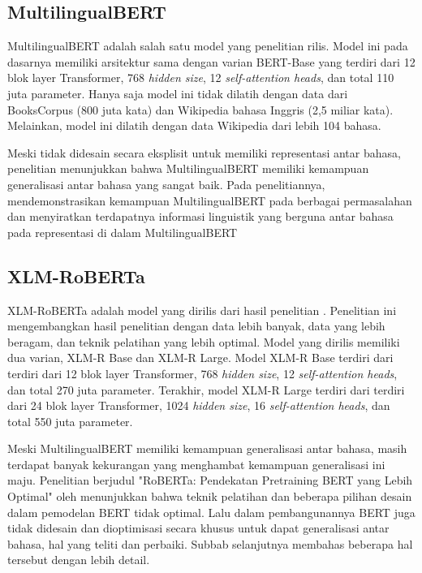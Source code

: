     \subsection{MultilingualBERT}
        MultilingualBERT adalah salah satu model yang penelitian \parencite{Devlin_Chang_Lee_Toutanova_2019} rilis. Model ini pada dasarnya memiliki arsitektur sama dengan varian BERT-Base yang terdiri dari 12 blok layer Transformer, 768 \textit{hidden size}, 12 \textit{self-attention heads}, dan total 110 juta parameter. Hanya saja model ini tidak dilatih dengan data dari BooksCorpus (800 juta kata) dan Wikipedia bahasa Inggris (2,5 miliar kata). Melainkan, model ini dilatih dengan data Wikipedia dari lebih 104 bahasa.
        
        Meski tidak didesain secara eksplisit untuk memiliki representasi antar bahasa, penelitian \parencite{Pires_Schlinger_Garrette_2019} menunjukkan bahwa MultilingualBERT memiliki kemampuan generalisasi antar bahasa yang sangat baik. Pada penelitiannya, \parencite{Pires_Schlinger_Garrette_2019} mendemonstrasikan kemampuan MultilingualBERT pada berbagai permasalahan dan menyiratkan terdapatnya informasi linguistik yang berguna antar bahasa  pada representasi di dalam MultilingualBERT

    \subsection{XLM-RoBERTa}
        XLM-RoBERTa adalah model yang dirilis dari hasil penelitian \parencite{Conneau_XLMR}. Penelitian ini mengembangkan hasil penelitian \parencite{LampleConneau2019} dengan data lebih banyak, data yang lebih beragam, dan teknik pelatihan yang lebih optimal. Model yang dirilis memiliki dua varian, XLM-R Base dan XLM-R Large. Model XLM-R Base terdiri dari terdiri dari 12 blok layer Transformer, 768 \textit{hidden size}, 12 \textit{self-attention heads}, dan total 270 juta parameter. Terakhir, model XLM-R Large terdiri dari terdiri dari 24 blok layer Transformer, 1024 \textit{hidden size}, 16 \textit{self-attention heads}, dan total 550 juta parameter. 

        Meski MultilingualBERT memiliki kemampuan generalisasi antar bahasa, masih terdapat banyak kekurangan yang menghambat kemampuan generalisasi ini maju.
        Penelitian berjudul "RoBERTa: Pendekatan Pretraining BERT yang Lebih Optimal" oleh \parencite{Liu_Ott_Goyal_Du_Joshi_Chen_Levy_Lewis_Zettlemoyer_Stoyanov_2019} menunjukkan bahwa teknik pelatihan dan beberapa pilihan desain dalam pemodelan BERT tidak optimal. Lalu dalam pembangunannya BERT juga tidak didesain dan dioptimisasi secara khusus untuk dapat generalisasi antar bahasa, hal yang \parencite{Conneau_XLMR} teliti dan perbaiki. Subbab selanjutnya membahas beberapa hal tersebut dengan lebih detail.


